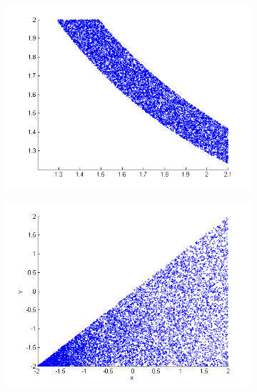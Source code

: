 \documentclass[letterpaper]{article}
\newcommand{\nn}{0.16}
\begin{document}
\begin{figure}
\begin{center}
\begin{subfigure}[b]{\nn\textwidth}
                \includegraphics[width=1\textwidth]{Figs/col_m1v1_when_p_is_3_and_v2_is_0_dot_2.png}
                \caption{}
                \label{fig:mom2}
        \end{subfigure}%
\hspace{4mm}
\begin{subfigure}[b]{\nn\textwidth}
                \includegraphics[width=1\textwidth]{Figs/col_v1v2.png}
                \caption{}
                \label{fig:mom2}
        \end{subfigure}%
\begin{subfigure}[b]{\nn\textwidth}

\end{subfigure}
\end{center}
\end{figure}
\end{document}
